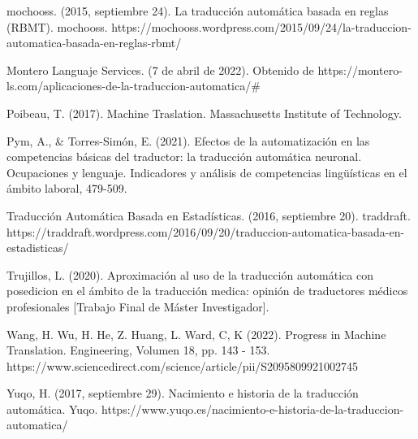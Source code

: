 \documentclass[conference]{IEEEtran}
\begin{document}
\begin{thebibliography}{00}
 mochooss. (2015, septiembre 24). La traducción automática basada en reglas (RBMT). mochooss. https://mochooss.wordpress.com/2015/09/24/la-traduccion-automatica-basada-en-reglas-rbmt/

Montero Languaje Services. (7 de abril de 2022). Obtenido de https://montero-ls.com/aplicaciones-de-la-traduccion-automatica/#

 Poibeau, T. (2017). Machine Traslation. Massachusetts Institute of Technology. 

Pym, A., & Torres-Simón, E. (2021). Efectos de la automatización en las competencias básicas del traductor: la traducción automática neuronal. Ocupaciones y lenguaje. Indicadores y análisis de competencias lingüísticas en el ámbito laboral, 479-509.

Traducción Automática Basada en Estadísticas. (2016, septiembre 20). traddraft. https://traddraft.wordpress.com/2016/09/20/traduccion-automatica-basada-en-estadisticas/ 

Trujillos, L. (2020). Aproximación al uso de la traducción automática con posedicion en el ámbito de la traducción medica: opinión de traductores médicos profesionales [Trabajo Final de Máster Investigador].

Wang, H. Wu, H. He, Z. Huang, L. Ward, C, K (2022). Progress in Machine Translation. Engineering, Volumen 18, pp. 143 - 153. https://www.sciencedirect.com/science/article/pii/S2095809921002745

Yuqo, H. (2017, septiembre 29). Nacimiento e historia de la traducción automática. Yuqo. https://www.yuqo.es/nacimiento-e-historia-de-la-traduccion-automatica/



\end{thebibliography}




\end{document}
